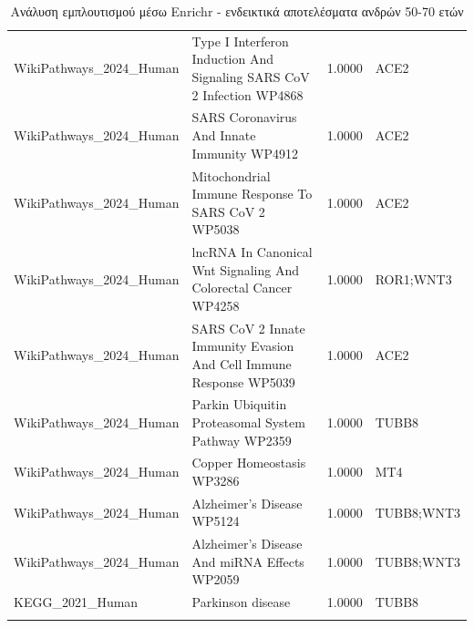 \documentclass[12pt]{report}
\renewcommand{\arraystretch}{1.5}
\begin{document}
\begin{table}[htbp]
\begin{tabular}{@{}>{\raggedright}p{3.2cm}>{\raggedright}p{8cm}S[table-format=1.2]>{\raggedright\arraybackslash}p{1.5cm}@{}}
            WikiPathways\_2024\_Human & Type I Interferon Induction And Signaling SARS CoV 2 Infection WP4868 & 1.0000 & ACE2 \\ \addlinespace
            WikiPathways\_2024\_Human & SARS Coronavirus And Innate Immunity WP4912 & 1.0000 & ACE2 \\ \addlinespace
            WikiPathways\_2024\_Human & Mitochondrial Immune Response To SARS CoV 2 WP5038 & 1.0000 & ACE2 \\ \addlinespace
            WikiPathways\_2024\_Human & lncRNA In Canonical Wnt Signaling And Colorectal Cancer WP4258 & 1.0000 & ROR1;WNT3 \\ \addlinespace
            WikiPathways\_2024\_Human & SARS CoV 2 Innate Immunity Evasion And Cell Immune Response WP5039 & 1.0000 & ACE2 \\ \addlinespace
            WikiPathways\_2024\_Human & Parkin Ubiquitin Proteasomal System Pathway WP2359 & 1.0000 & TUBB8 \\ \addlinespace
            WikiPathways\_2024\_Human & Copper Homeostasis WP3286 & 1.0000 & MT4 \\ \addlinespace
            WikiPathways\_2024\_Human & Alzheimer's Disease WP5124 & 1.0000 & TUBB8;WNT3 \\ \addlinespace
            WikiPathways\_2024\_Human & Alzheimer's Disease And miRNA Effects WP2059 & 1.0000 & TUBB8;WNT3 \\ \addlinespace
            KEGG\_2021\_Human & Parkinson disease & 1.0000 & TUBB8 \\ \addlinespace
            \bottomrule
        \end{tabular}
        \caption{Ανάλυση εμπλουτισμού μέσω Enrichr - ενδεικτικά αποτελέσματα ανδρών 50-70 ετών}
        \label{tab:enrichr-males-50-70}
    \end{table}    
    
\end{document}
